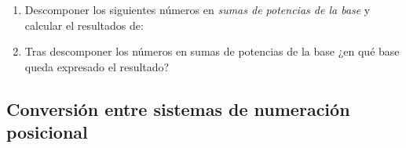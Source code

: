 \documentclass[12pt]{article}
\begin{document}
\begin{enumerate}[resume]

    \item Descomponer los siguientes números en \emph{sumas de potencias de la
        base} y calcular el resultados de:


    \item Tras descomponer los números en sumas de potencias de la base ¿en
        qué base queda expresado el resultado?

\end{enumerate}

\subsection{Conversión entre sistemas de numeración posicional}
\end{document}
